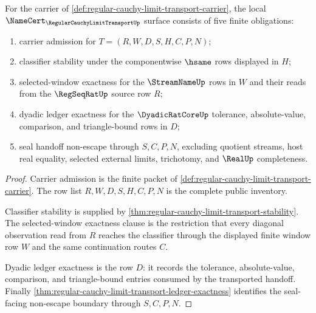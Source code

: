 \begin{theorem}
\label{thm:regular-cauchy-limit-transport-namecert-obligations}
For the carrier of \autoref{def:regular-cauchy-limit-transport-carrier}, the local $\NameCert_{\RegularCauchyLimitTransportUp}$ surface consists of five finite obligations:
\begin{enumerate}
\item carrier admission for $T=(R,W,D,S,H,C,P,N)$;
\item classifier stability under the componentwise $\hsame$ rows displayed in $H$;
\item selected-window exactness for the $\StreamNameUp$ rows in $W$ and their reads from the $\RegSeqRatUp$ source row $R$;
\item dyadic ledger exactness for the $\DyadicRatCoreUp$ tolerance, absolute-value, comparison, and triangle-bound rows in $D$;
\item seal handoff non-escape through $S,C,P,N$, excluding quotient streams, host real equality, selected external limits, trichotomy, and $\RealUp$ completeness.
\end{enumerate}
\end{theorem}
\begin{proof}
Carrier admission is the finite packet of \autoref{def:regular-cauchy-limit-transport-carrier}. The row list $R,W,D,S,H,C,P,N$ is the complete public inventory.

Classifier stability is supplied by \autoref{thm:regular-cauchy-limit-transport-stability}. The selected-window exactness clause is the restriction that every diagonal observation read from $R$ reaches the classifier through the displayed finite window row $W$ and the same continuation routes $C$.

Dyadic ledger exactness is the row $D$: it records the tolerance, absolute-value, comparison, and triangle-bound entries consumed by the transported handoff. Finally \autoref{thm:regular-cauchy-limit-transport-ledger-exactness} identifies the seal-facing non-escape boundary through $S,C,P,N$.
\end{proof}

